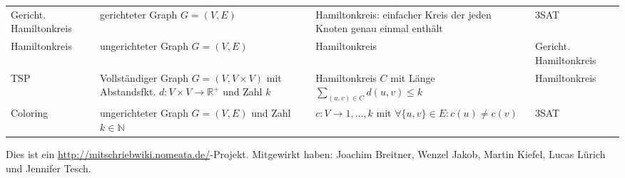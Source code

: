 \documentclass{article}
\newcommand{\h}[1]{\vspace{1ex}\begin{center}\small\textbf{#1}\end{center}}
\begin{document}
\begin{tabular}{p{1.6cm}p{6cm}p{6cm}p{1.8cm}}
		Gericht. Hamiltonkreis &	gerichteter Graph $G=(V,E)$	&	Hamiltonkreis: einfacher Kreis der jeden Knoten genau einmal enthält	& 3SAT \\
		Hamiltonkreis & ungerichteter Graph $G=(V,E)$	&	Hamiltonkreis	& Gericht. Hamiltonkreis \\
		TSP					& Vollständiger Graph $G=(V,V\times V)$ mit Abstandsfkt. $d:V\times V\to\mathbb{R}^+$ und Zahl $k$ & Hamiltonkreis $C$ mit Länge $\sum_{(u,v)\in C} d(u,v)\le k$ & Hamiltonkreis \\
		Coloring		&	ungerichteter Graph $G=(V,E)$ und Zahl $k \in \mathbb{N}$ &	$c:V\to 1,\ldots,k$ mit $\forall{\{u,v\}\in E}: c(u) \ne c(v)$	& 3SAT \\
								
		\end{tabular}



Dies ist ein \url{http://mitschriebwiki.nomeata.de/}-Projekt. Mitgewirkt haben: Joachim Breitner, Wenzel Jakob, Martin Kiefel, Lucas Lürich und Jennifer Tesch.
\end{document}
